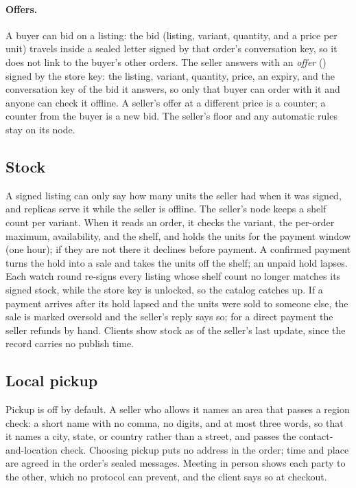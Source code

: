 \paragraph{Offers.} A buyer can bid on a listing: the bid (listing, variant, quantity, and a price per unit) travels inside a sealed letter signed by that order's conversation key, so it does not link to the buyer's other orders. The seller answers with an \emph{offer} () signed by the store key: the listing, variant, quantity, price, an expiry, and the conversation key of the bid it answers, so only that buyer can order with it and anyone can check it offline. A seller's offer at a different price is a counter; a counter from the buyer is a new bid. The seller's floor and any automatic rules stay on its node.

\subsection{Stock}

A signed listing can only say how many units the seller had when it was signed, and replicas serve it while the seller is offline. The seller's node keeps a shelf count per variant. When it reads an order, it checks the variant, the per-order maximum, availability, and the shelf, and holds the units for the payment window (one hour); if they are not there it declines before payment. A confirmed payment turns the hold into a sale and takes the units off the shelf; an unpaid hold lapses. Each watch round re-signs every listing whose shelf count no longer matches its signed stock, while the store key is unlocked, so the catalog catches up. If a payment arrives after its hold lapsed and the units were sold to someone else, the sale is marked oversold and the seller's reply says so; for a direct payment the seller refunds by hand. Clients show stock as of the seller's last update, since the record carries no publish time.

\subsection{Local pickup}

Pickup is off by default. A seller who allows it names an area that passes a region check: a short name with no comma, no digits, and at most three words, so that it names a city, state, or country rather than a street, and passes the contact-and-location check. Choosing pickup puts no address in the order; time and place are agreed in the order's sealed messages. Meeting in person shows each party to the other, which no protocol can prevent, and the client says so at checkout.

